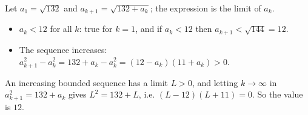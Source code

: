 Let $a_1=\sqrt{132}$ and $a_{k+1}=\sqrt{132+a_k}$; the expression is the limit of $a_k$.
\begin{itemize}
\item $a_k<12$ for all $k$: true for $k=1$, and if $a_k<12$ then $a_{k+1}<\sqrt{144}=12$.
\item The sequence increases: $a_{k+1}^2-a_k^2=132+a_k-a_k^2=(12-a_k)(11+a_k)>0$.
\end{itemize}
An increasing bounded sequence has a limit $L>0$, and letting $k\to\infty$ in $a_{k+1}^2=132+a_k$ gives $L^2=132+L$, i.e. $(L-12)(L+11)=0$. So the value is $\boxed{12}$.
